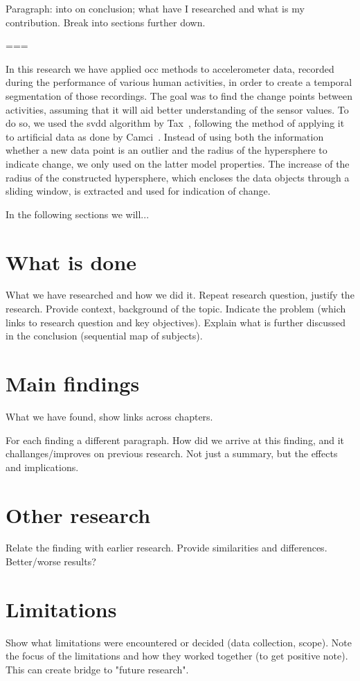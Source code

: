 Paragraph: into on conclusion; what have I researched and what is my contribution.
Break into sections further down.

===

In this research we have applied \gls{occ} methods to accelerometer data, recorded during the performance of various human activities, in order to create a temporal segmentation of those recordings.
The goal was to find the change points between activities, assuming that it will aid better understanding of the sensor values.
To do so, we used the \gls{svdd} algorithm by Tax~\cite{tax1999support}, following the method of applying it to artificial data as done by Camci~\cite{camci2010change}.
Instead of using both the information whether a new data point is an outlier and the radius of the hypersphere to indicate change, we only used on the latter model properties.
The increase of the radius of the constructed hypersphere, which encloses the data objects through a sliding window, is extracted and used for indication of change.

In the following sections we will...


\section{What is done}
What we have researched and how we did it.
Repeat research question, justify the research.
Provide context, background of the topic.
Indicate the problem (which links to research question and key objectives).
Explain what is further discussed in the conclusion (sequential map of subjects).

\section{Main findings}
What we have found, show links across chapters.

For each finding a different paragraph.
How did we arrive at this finding, and it challanges/improves on previous research.
Not just a summary, but the effects and implications.

\section{Other research}
Relate the finding with earlier research.
Provide similarities and differences.
Better/worse results?

\section{Limitations}
Show what limitations were encountered or decided (data collection, scope).
Note the focus of the limitations and how they worked together (to get positive note).
This can create bridge to "future research".

